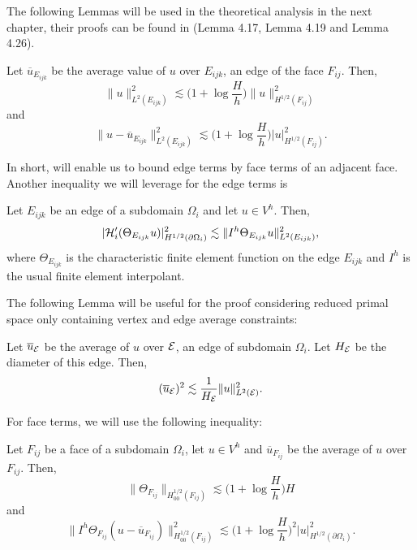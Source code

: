 The following Lemmas will be used in the theoretical analysis in the next chapter, their proofs can be found in \cite{dd-book} (Lemma 4.17, Lemma 4.19 and Lemma 4.26).

\begin{lemma}
\label{sec2:edge-face}
    Let $\overline{u}_{E_{ijk}}$ be the average value of $u$ over $E_{ijk}$, an edge of the face $F_{ij}$. Then,
    \[\|u\|^2_{L^2(E_{ijk})} \lesssim \bigg( 1 + \log\frac{H}{h} \bigg) \|u\|^2_{H^{1/2}(F_{ij})}\]
    and
    \[\|u - \overline{u}_{E_{ijk}}\|^2_{L^2(E_{ijk})} \lesssim \bigg(1 + \log\frac{H}{h}\bigg) |u|^2_{H^{1/2}(F_{ij})}.\]
\end{lemma}

In short,  will enable us to bound edge terms by face terms of an adjacent face. Another inequality we will leverage for the edge terms is
\begin{lemma}
\label{sec2:boundary-edge}
    Let $E_{ijk}$ be an edge of a subdomain $\Omega_i$ and let $u \in V^h$. Then, 
    \[|\mathcal{H}_i'(\Theta_{E_{ijk}} u)|_{H^{1/2}(\partial \Omega_i)}^2 \lesssim \|I^h\Theta_{E_{ijk}}u\|_{L^2(E_{ijk})}^2,\]
    where $\Theta_{E_{ijk}}$ is the characteristic finite element function on the edge $E_{ijk}$ and $I^h$ is the usual finite element interpolant.
\end{lemma}

The following Lemma will be useful for the proof considering reduced primal space only containing vertex and edge average constraints:

\begin{lemma}
    Let $\overline{u}_{\mathcal{E}}$ be the average of $u$ over $\mathcal{E}$, an edge of subdomain $\Omega_i$. Let $H_{\mathcal{E}}$ be the diameter of this edge. Then,
    \[(\overline{u}_{\mathcal{E}})^2 \lesssim \frac{1}{H_{\mathcal{E}}} \|u\|^2_{L^2(\mathcal{E})}.\]
    \label{edge-average}
\end{lemma}

For face terms, we will use the following inequality:

\begin{lemma}
\label{sec2:face}
    Let $F_{ij}$ be a face of a subdomain $\Omega_i$, let $u \in V^h$ and $\overline{u}_{F_{ij}}$ be the average of $u$ over $F_{ij}$. Then,
    \[\|\Theta_{F_{ij}}\|_{H^{1/2}_{00}(F_{ij})} \lesssim \bigg(1 + \log\frac{H}{h}\bigg)H\]
    and
    \[\|I^h\Theta_{F_{ij}}(u - \overline{u}_{F_{ij}})\|^2_{H^{1/2}_{00}(F_{ij})} \lesssim \bigg(1 + \log\frac{H}{h}\bigg)^2|u|^2_{H^{1/2}(\partial\Omega_i)}.\]
\end{lemma}

